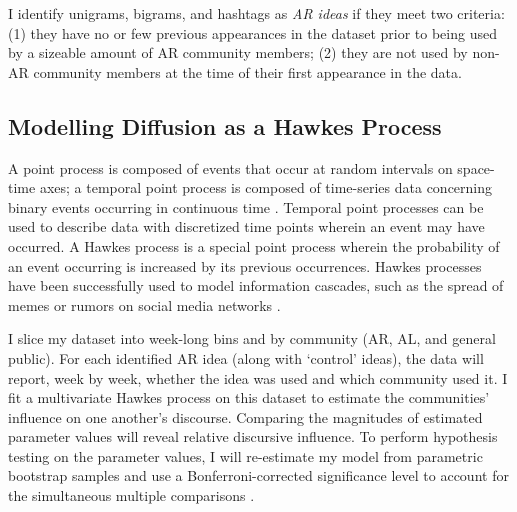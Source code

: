 \documentclass[acmlarge, screen, authorversion]{acmart}
\begin{document}
I identify unigrams, bigrams, and hashtags as \textit{AR ideas} if they meet two criteria: (1) they have no or few previous appearances in the dataset prior to being used by a sizeable amount of AR community members; (2) they are not used by non-AR community members at the time of their first appearance in the data.

\subsection{Modelling Diffusion as a Hawkes Process}

A point process is composed of events that occur at random intervals on space-time axes; a temporal point process is composed of time-series data concerning binary events occurring in continuous time \cite{daleyIntroductionTheoryPoint2003, ogataSpaceTimePointProcessModels1998}. Temporal point processes can be used to describe data with discretized time points wherein an event may have occurred. A Hawkes process is a special point process wherein the probability of an event occurring is increased by its previous occurrences. Hawkes processes have been successfully used to model information cascades, such as the spread of memes or rumors on social media networks \cite{luoMultiTaskMultiDimensionalHawkes2015,lukasikHawkesProcessesContinuous2016}.

I slice my dataset into week-long bins and by community (AR, AL, and general public). For each identified AR idea (along with  `control' ideas), the data will report, week by week, whether the idea was used and which community used it. I fit a multivariate Hawkes process on this dataset to estimate the communities' influence on one another's discourse. Comparing the magnitudes of estimated parameter values will reveal relative discursive influence. To perform hypothesis testing on the parameter values, I will re-estimate my model from parametric bootstrap samples \cite{reinhartReviewSelfExcitingSpatioTemporal2018} and use a Bonferroni-corrected significance level to account for the simultaneous multiple comparisons \cite{tanEffectWordingMessage2014}.


\end{document}

